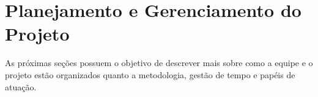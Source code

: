 \chapter{Planejamento e Gerenciamento do Projeto}
As próximas seções possuem o objetivo de descrever mais sobre como a equipe e o projeto estão organizados quanto a metodologia, gestão de tempo e papéis de atuação.





